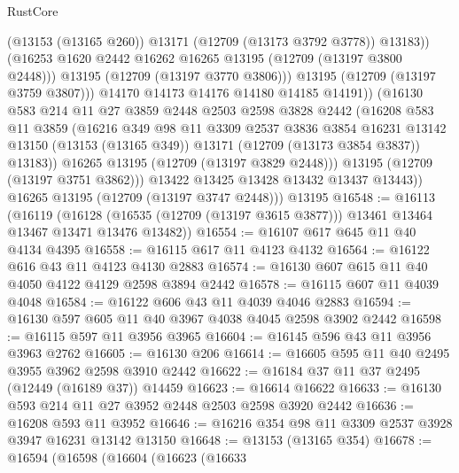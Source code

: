 \begin{lexlean}{RustCore}
\begin{coremodule}
                        (@13153 (@13165 @260))
                        @13171
                        (@12709 (@13173 @3792 @3778))
                        @13183))
                    (@16253 @1620 @2442 @16262 @16265 @13195 (@12709 (@13197 @3800 @2448)))
                    @13195
                    (@12709 (@13197 @3770 @3806)))
                  @13195
                  (@12709 (@13197 @3759 @3807)))
                @14170
                @14173
                @14176
                @14180
                @14185
                @14191))
            (@16130
              @583
              @214
              @11
              @27
              @3859
              @2448
              @2503
              @2598
              @3828
              @2442
              (@16208
                @583
                @11
                @3859
                (@16216
                  @349
                  @98
                  @11
                  @3309
                  @2537
                  @3836
                  @3854
                  @16231
                  @13142
                  @13150
                  (@13153 (@13165 @349))
                  @13171
                  (@12709 (@13173 @3854 @3837))
                  @13183))
              @16265
              @13195
              (@12709 (@13197 @3829 @2448)))
            @13195
            (@12709 (@13197 @3751 @3862)))
          @13422
          @13425
          @13428
          @13432
          @13437
          @13443))
      @16265
      @13195
      (@12709 (@13197 @3747 @2448)))
    @13195
@16548 := @16113
    (@16119
      (@16128 (@16535 (@12709 (@13197 @3615 @3877))) @13461 @13464 @13467 @13471 @13476 @13482))
@16554 := @16107 @617 @645 @11 @40 @4134 @4395
@16558 := @16115 @617 @11 @4123 @4132
@16564 := @16122 @616 @43 @11 @4123 @4130 @2883
@16574 := @16130 @607 @615 @11 @40 @4050 @4122 @4129 @2598 @3894 @2442
@16578 := @16115 @607 @11 @4039 @4048
@16584 := @16122 @606 @43 @11 @4039 @4046 @2883
@16594 := @16130 @597 @605 @11 @40 @3967 @4038 @4045 @2598 @3902 @2442
@16598 := @16115 @597 @11 @3956 @3965
@16604 := @16145 @596 @43 @11 @3956 @3963 @2762
@16605 := @16130 @206
@16614 := @16605 @595 @11 @40 @2495 @3955 @3962 @2598 @3910 @2442
@16622 := @16184 @37 @11 @37 @2495 (@12449 (@16189 @37)) @14459
@16623 := @16614 @16622
@16633 := @16130 @593 @214 @11 @27 @3952 @2448 @2503 @2598 @3920 @2442
@16636 := @16208 @593 @11 @3952
@16646 := @16216 @354 @98 @11 @3309 @2537 @3928 @3947 @16231 @13142 @13150
@16648 := @13153 (@13165 @354)
@16678 := @16594
    (@16598
      (@16604
        (@16623
          (@16633

\end{coremodule}
\end{lexlean}
